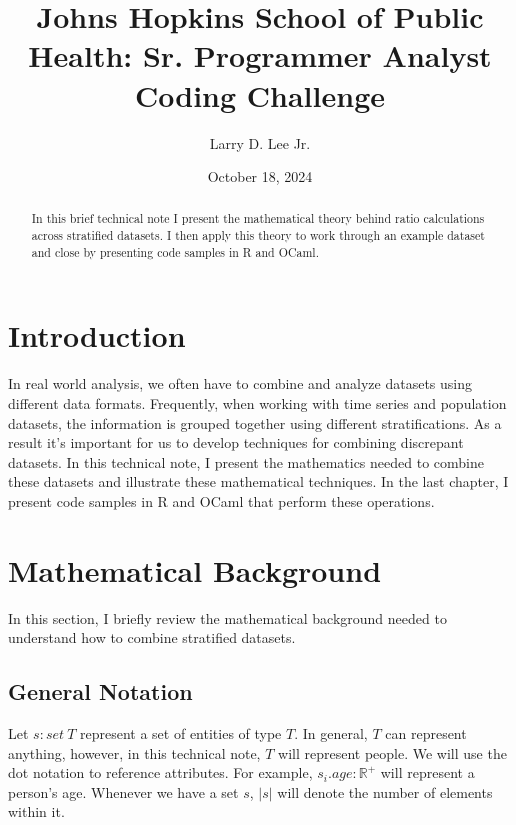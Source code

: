 \documentclass[]{article}
\title{Johns Hopkins School of Public Health: Sr. Programmer Analyst Coding Challenge}
\date{October 18, 2024}
\author{Larry D. Lee Jr.}
\begin{document}
\maketitle

\begin{abstract}
In this brief technical note I present the mathematical theory
behind ratio calculations across stratified datasets. I then apply this
theory to work through an example dataset and close by presenting code
samples in R and OCaml.
\end{abstract}

\hypertarget{introduction}{%
\section{Introduction}\label{introduction}}

In real world analysis, we often have to combine and analyze datasets
using different data formats. Frequently, when working with time series
and population datasets, the information is grouped together using
different stratifications. As a result it's important for us to develop
techniques for combining discrepant datasets. In this technical note, I
present the mathematics needed to combine these datasets and illustrate
these mathematical techniques. In the last chapter, I present code
samples in R and OCaml that perform these operations.

\hypertarget{mathematical-background}{%
\section{Mathematical Background}\label{mathematical-background}}

In this section, I briefly review the mathematical background needed to
understand how to combine stratified datasets.

\hypertarget{general-notation}{%
\subsection{General Notation}\label{general-notation}}

Let \(s : set\ T\) represent a set of entities of type \(T\). In
general, \(T\) can represent anything, however, in this technical note,
\(T\) will represent people. We will use the dot notation to reference
attributes. For example, \(s_i.age : \mathbb{R^+}\) will represent a
person's age. Whenever we have a set \(s\), \(|s|\) will denote the
number of elements within it.
\end{document}
